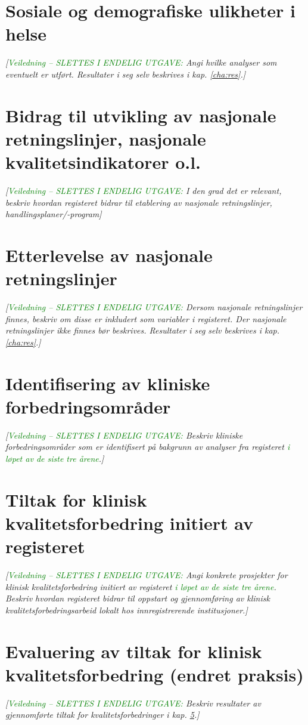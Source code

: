 \documentclass[norsk, a4paper, twocolumn]{report}
\newcommand{\newtext}[1]{\cbstart\textcolor{green}{#1\cbend}}
\newcommand{\guide}[1] {
	\textit{[\textcolor{guidegray}{\newtext{Veiledning -- SLETTES I ENDELIG
	UTGAVE:} #1}]}
	}
\begin{document}
\section{Sosiale og demografiske ulikheter i helse}\label{sec:sosdem}
\guide{Angi hvilke analyser som eventuelt er utført. Resultater i seg selv
beskrives i kap. \ref{cha:res}.}

\section{Bidrag til utvikling av nasjonale retningslinjer, nasjonale
kvalitetsindikatorer o.l.}\label{sec:retut}
\guide{I den grad det er relevant, beskriv hvordan registeret bidrar til
etablering av nasjonale retningslinjer, handlingsplaner/-program}

\section{Etterlevelse av nasjonale retningslinjer}\label{sec:retbru}
\guide{Dersom nasjonale retningslinjer finnes, beskriv om disse er inkludert
som variabler i registeret. Der nasjonale retningslinjer ikke finnes bør
\normalfont{best practice}
\textit{beskrives. Resultater i seg selv beskrives i kap. \ref{cha:res}.}}

\section{Identifisering av kliniske forbedringsområder}\label{sec:ide}
\guide{Beskriv kliniske forbedringsområder som er identifisert på bakgrunn
av analyser fra registeret \newtext{i løpet av de siste tre årene}.}

\section{Tiltak for klinisk kvalitetsforbedring initiert av
registeret}\label{sec:brures}
\guide{Angi konkrete prosjekter for klinisk kvalitetsforbedring initiert av
registeret \newtext{i løpet av de siste tre årene}. Beskriv hvordan registeret
bidrar til oppstart og gjennomføring av klinisk kvalitetsforbedringsarbeid
lokalt hos innregistrerende institusjoner.}

\section{Evaluering av tiltak for klinisk kvalitetsforbedring (endret praksis)}\label{sec:evakva}
\guide{Beskriv resultater av gjennomførte tiltak for kvalitetsforbedringer
i kap. \ref{sec:brures}.}
\end{document}

